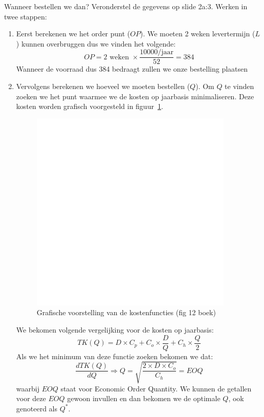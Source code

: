 Wanneer bestellen we dan? Veronderstel de gegevens op slide 2a:3. Werken in twee stappen:
\begin{enumerate}
    \item Eerst berekenen we het order punt ($OP$). We moeten 2 weken levertermijn ($L$) kunnen overbruggen dus we vinden het volgende:
    \begin{equation*}
        OP = 2 \text{ weken } \times \frac{10000\text{/jaar}}{52} = 384
    \end{equation*}
    Wanneer de voorraad dus 384 bedraagt zullen we onze bestelling plaatsen

    \item Vervolgens berekenen we hoeveel we moeten bestellen ($Q$). Om $Q$ te vinden zoeken we het punt waarmee we de kosten op jaarbasis minimaliseren. Deze kosten worden grafisch voorgesteld in figuur~\ref{fig:kostenGrafisch}.
    \begin{figure}[htbp]
        \centering
        \includegraphics[scale=0.4]{Images/white.png}
        \caption{Grafische voorstelling van de kostenfuncties (fig 12 boek)}
        \label{fig:kostenGrafisch}
    \end{figure}

    We bekomen volgende vergelijking voor de kosten op jaarbasis:
    \begin{equation}
        TK(Q) = D \times C_p + C_o \times \frac{D}{Q} + C_h \times \frac{Q}{2} \label{eq:jaarlijkseKosten}
    \end{equation}
    Als we het minimum van deze functie zoeken bekomen we dat:
    \begin{equation}
        \frac{dTK(Q)}{dQ} \Rightarrow Q = \sqrt{\frac{2 \times D \times C_o}{C_h}} = EOQ \label{eq:eoq}
    \end{equation}
    waarbij $EOQ$ staat voor Economic Order Quantity. We kunnen de getallen voor deze $EOQ$ gewoon invullen en dan bekomen we de optimale $Q$, ook genoteerd als $Q^*$.

\end{enumerate}

